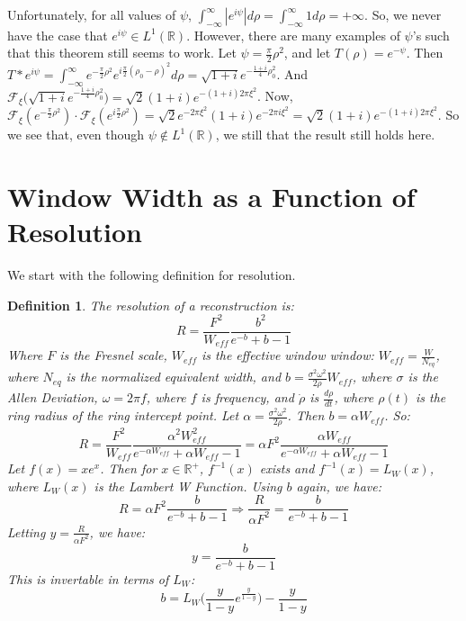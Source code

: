 \documentclass[oneside]{book}
\theoremstyle{mystyle}
\newtheorem{definition}{Definition}[section]
\begin{document}
Unfortunately, for all values of $\psi$, $\int_{-\infty}^{\infty} |e^{i\psi}|d\rho = \int_{-\infty}^{\infty} 1d\rho = +\infty$. So, we never have the case that $e^{i\psi} \in L^{1}(\mathbb{R})$. However, there are many examples of $\psi$'s such that this theorem still seems to work. Let $\psi = \frac{\pi}{2}\rho^2$, and let $T(\rho) = e^{-\psi}$. Then $T*e^{i\psi} = \int_{-\infty}^{\infty} e^{-\frac{\pi}{2}\rho^2}e^{i\frac{\pi}{2}(\rho_0-\rho)^2}d\rho = \sqrt{1+i}e^{-\frac{1+i}{4}\rho_0^2}$. And $\mathcal{F}_{\xi}\big(\sqrt{1+i}e^{-\frac{1+i}{4}\rho_0^2}\big) = \sqrt{2}(1+i)e^{-(1+i)2\pi \xi^2}$. Now, $\mathcal{F}_{\xi}(e^{-\frac{\pi}{2}\rho^2})\cdot \mathcal{F}_{\xi}(e^{i\frac{\pi}{2}\rho^2}) = \sqrt{2}e^{-2\pi \xi^2}(1+i)e^{-2\pi i \xi^2} = \sqrt{2}(1+i)e^{-(1+i)2\pi \xi^2}$. So we see that, even though $\psi \notin L^{1}(\mathbb{R})$, we still that the result still holds here. 
\section{Window Width as a Function of Resolution}
We start with the following definition for resolution.
\begin{definition}
The resolution of a reconstruction is:
\begin{equation*}
    R = \frac{F^2}{W_{eff}}\frac{b^2}{e^{-b}+b-1}
\end{equation*}
Where $F$ is the Fresnel scale, $W_{eff}$ is the effective window window: $W_{eff} = \frac{W}{N_{eq}}$, where $N_{eq}$ is the normalized equivalent width, and $b = \frac{\sigma^2 \omega^2}{2\dot{\rho}}W_{eff}$, where $\sigma$ is the Allen Deviation, $\omega = 2\pi f$, where $f$ is frequency, and $\dot{\rho}$ is $\frac{d\rho}{dt}$, where $\rho(t)$ is the ring radius of the ring intercept point. Let $\alpha = \frac{\sigma^2 \omega^2}{2\dot{\rho}}$. Then $b = \alpha W_{eff}$. So:
\begin{equation*}
R = \frac{F^2}{W_{eff}}\frac{\alpha^2 W_{eff}^2}{e^{-\alpha W_{eff}}+\alpha W_{eff}-1} = \alpha F^2 \frac{\alpha W_{eff}}{e^{-\alpha W_{eff}}+\alpha W_{eff} - 1}
\end{equation*}
Let $f(x) = xe^{x}$. Then for $x\in \mathbb{R}^{+}$, $f^{-1}(x)$ exists and $f^{-1}(x) = L_{W}(x)$, where $L_{W}(x)$ is the Lambert W Function. Using $b$ again, we have:
\begin{equation*}
    R = \alpha F^2 \frac{b}{e^{-b}+b-1}\Rightarrow \frac{R}{\alpha F^2} = \frac{b}{e^{-b}+b-1}
\end{equation*}
Letting $y = \frac{R}{\alpha F^2}$, we have:
\begin{equation*}
    y = \frac{b}{e^{-b}+b-1}
\end{equation*}
This is invertable in terms of $L_{W}$:
\begin{equation*}
    b = L_{W}\bigg(\frac{y}{1-y}e^{\frac{y}{1-y}}\bigg) - \frac{y}{1-y}
\end{equation*}
\end{definition}
\end{document}
